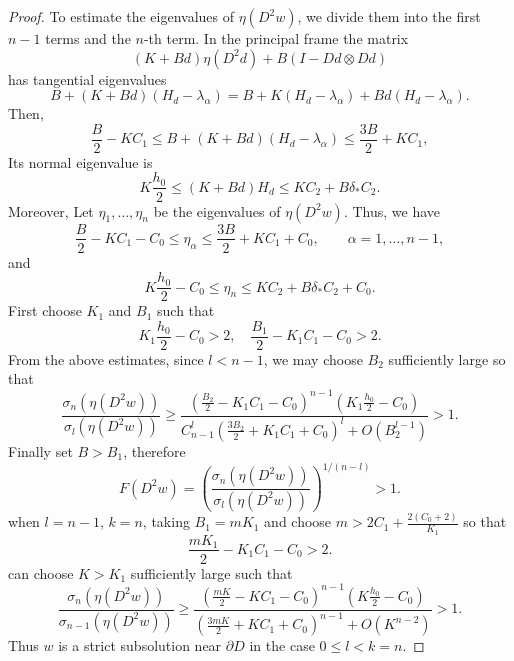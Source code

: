 \documentclass[reqno,a4paper]{amsart}
\numberwithin{equation}{section}
\begin{document}
\begin{proof}
		To estimate the eigenvalues of $\eta(D^2 w)$, we divide them into the first $n-1$ terms and the $n$-th term.
		In the principal frame the matrix
		\[
		(K + B d) \eta(D^2 d) + B (I - Dd \otimes Dd)
		\]
		has tangential eigenvalues
		\[
		B + (K + B d)(H_d - \lambda_\alpha)
		= B + K(H_d - \lambda_\alpha) + B d (H_d - \lambda_\alpha).
		\]
		Then,
		\[
		\frac{B}{2} - K C_1
		\le
		B + (K + Bd)(H_d - \lambda_\alpha)
		\le
		\frac{3B}{2} + K C_1,
		\]
		Its normal eigenvalue is
		$$K \dfrac{h_0}{2} \le (K + Bd)H_d \le K C_2 + B\delta_* C_2.$$
		Moreover, 
		Let \(\eta_1,\dots,\eta_n\) be the eigenvalues of \(\eta(D^2w)\). 
		Thus, we have
		\begin{equation}
			\frac{B}{2} - K C_1 - C_0
			\le \eta_\alpha \le
			\frac{3B}{2} + K C_1 + C_0,
			\qquad \alpha = 1,\dots,n-1,
		\end{equation}
		and
		\begin{equation}
			K \frac{h_0}{2} - C_0
			\le \eta_n \le
			K C_2 + B\delta_* C_2 + C_0.
		\end{equation}
		First choose $K_1$ and $B_1$ such that $$K_1 \frac{h_0}{2} - C_0>2,\quad \frac{B_1}{2} - K_1 C_1 - C_0>2.$$
		From the above estimates, since \(l<n-1\), we may choose \(B_2\) sufficiently large so that
		\begin{equation}
			\frac{\sigma_n(\eta(D^2 w))}{\sigma_l(\eta(D^2 w))}
			\geq 
			\frac{
				\left( \frac{B_2}{2} - K_1 C_1 - C_0 \right)^{n-1}
				\left( K_1 \frac{h_0}{2} - C_0 \right)
			}{
				C_{n-1}^l 
				\left( \frac{3B_2}{2} + K_1 C_1 + C_0 \right)^l
				+ O(B^{l-1}_2)
			} > 1.
		\end{equation}
		Finally set $B>B_1$, therefore
		\begin{equation}
			F(D^2 w) = \left( \frac{\sigma_n(\eta(D^2 w))}{\sigma_l(\eta(D^2 w))} \right)^{1/(n-l)} > 1.
		\end{equation}
		when $l=n-1$, $k=n$, taking $B_1=mK_1$ and choose $m > 2C_1 + \frac{2(C_0+2)}{K_1}$  so that
		$$\frac{mK_1}{2} - K_1 C_1 - C_0>2.$$
		can choose  $K>K_1$ sufficiently large  such that
		\begin{equation}
			\frac{\sigma_n(\eta(D^2 w))}{\sigma_{n-1}(\eta(D^2 w))}
			\geq 
			\frac{
				\left( \frac{mK}{2} - K C_1 - C_0 \right)^{n-1}
				\left( K \frac{h_0}{2} - C_0 \right)
			}{
				\left( \frac{3mK}{2} + K C_1 + C_0 \right)^{n-1}
				+ O(K^{n-2})
			} > 1.
		\end{equation}
		Thus $w$ is a strict subsolution near $\partial D$ in the case $0\leq l<k = n$.
		

\end{proof}
\end{document}
